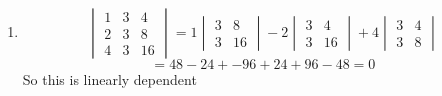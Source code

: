 \documentclass[12pt,letterpaper]{article}
\theoremstyle{definition}
\begin{document}
\begin{changemargin}{.5cm}{0cm}
\begin{enumerate}[label=(\alph*)]
    \item 
    \begin{equation*}
        \begin{vmatrix}
            1 &  3 & 4\\
            2 &  3 & 8\\
            4 &  3 & 16
        \end{vmatrix}=
        1\begin{vmatrix}
            3 & 8\\
            3 & 16
        \end{vmatrix}
        -2\begin{vmatrix}
            3 & 4\\
            3 & 16
        \end{vmatrix}
        +4\begin{vmatrix}
            3 & 4\\
            3 & 8
        \end{vmatrix}
    \end{equation*}
    \begin{equation*}
    = 48-24+ -96+24 + 96-48 = 0 
   \end{equation*}
   So this is linearly dependent 
\end{enumerate}


    \end{changemargin}
\end{document}
